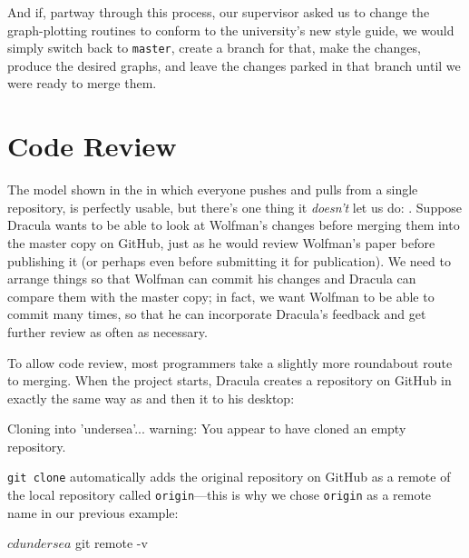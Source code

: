 \documentclass{book}
\begin{document}
And if, partway through this process, our supervisor asked us to change
the graph-plotting routines to conform to the university's new style
guide, we would simply switch back to \texttt{master}, create a branch
for that, make the changes, produce the desired graphs, and leave the
changes parked in that branch until we were ready to merge them.

\section{Code Review}

The model shown in the  in
which everyone pushes and pulls from a single repository, is perfectly
usable, but there's one thing it \emph{doesn't} let us do:
. Suppose Dracula wants to be able
to look at Wolfman's changes before merging them into the master copy on
GitHub, just as he would review Wolfman's paper before publishing it (or
perhaps even before submitting it for publication). We need to arrange
things so that Wolfman can commit his changes and Dracula can compare
them with the master copy; in fact, we want Wolfman to be able to commit
many times, so that he can incorporate Dracula's feedback and get
further review as often as necessary.

To allow code review, most programmers take a slightly more roundabout
route to merging. When the project starts, Dracula creates a repository
on GitHub in exactly the same way as  and then
 it to his desktop:


\begin{VerbOut}
Cloning into 'undersea'...
warning: You appear to have cloned an empty repository.
\end{VerbOut}

\texttt{git clone} automatically adds the original repository on GitHub
as a remote of the local repository called \texttt{origin}---this is why
we chose \texttt{origin} as a remote name in our previous example:

\begin{VerbIn}
$ cd undersea
$ git remote -v
\end{VerbIn}
\end{document}
